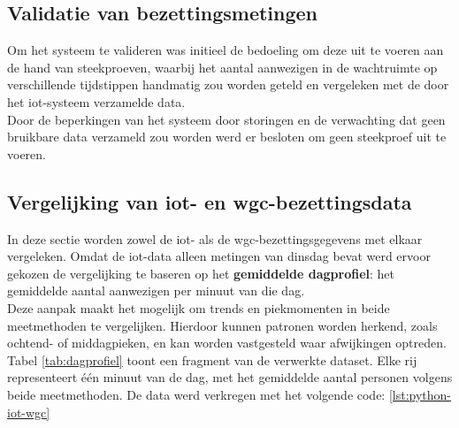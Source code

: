 

\subsection{Validatie van bezettingsmetingen}
Om het systeem te valideren was initieel de bedoeling om deze uit te voeren aan de hand van steekproeven, waarbij het aantal aanwezigen in de wachtruimte op verschillende tijdstippen handmatig zou worden geteld en vergeleken met de door het \gls{iot}-systeem verzamelde data. \\

Door de beperkingen van het systeem door storingen en de verwachting dat geen bruikbare data verzameld zou worden werd er besloten om geen steekproef uit te voeren.

\subsection{Vergelijking van \gls{iot}- en \gls{wgc}-bezettingsdata}
In deze sectie worden zowel de \gls{iot}- als de \gls{wgc}-bezettingsgegevens met elkaar vergeleken. Omdat de \gls{iot}-data alleen metingen van dinsdag bevat werd ervoor gekozen de vergelijking te baseren op het \textbf{gemiddelde dagprofiel}: het gemiddelde aantal aanwezigen per minuut van die dag. \\

Deze aanpak maakt het mogelijk om trends en piekmomenten in beide meetmethoden te vergelijken. Hierdoor kunnen patronen worden herkend, zoals ochtend- of middagpieken, en kan worden vastgesteld waar afwijkingen optreden. \\

Tabel \ref{tab:dagprofiel} toont een fragment van de verwerkte dataset. Elke rij representeert één minuut van de dag, met het gemiddelde aantal personen volgens beide meetmethoden. De data werd verkregen met het volgende code: \ref{lst:python-iot-wgc}

